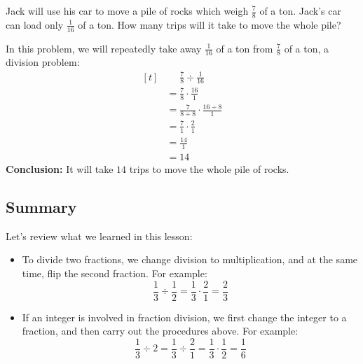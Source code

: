 \begin{myexample}
Jack will use his car to move a pile of rocks which weigh $\frac{7}{8}$ of a ton. Jack's car can load only $\frac{1}{16}$ of a ton. How many trips will it take to move the whole pile?
\end{myexample}
\begin{solution}
In this problem, we will repeatedly take away $\frac{1}{16}$ of a ton from $\frac{7}{8}$ of a ton, a division problem:
\[ 
\begin{aligned}[t]
	&\phantom{{}=} \frac{7}{8} \div \frac{1}{16} \\
	&= \frac{7}{8} \cdot \frac{16}{1} \\
	&= \frac{7}{8\div8} \cdot \frac{16\div8}{1} \\
	&= \frac{7}{1} \cdot \frac{2}{1} \\
	&= \frac{14}{1} \\
	&= 14
\end{aligned}
\]
\textbf{Conclusion:} It will take $14$ trips to move the whole pile of rocks.
\end{solution}


\subsection{Summary}
Let's review what we learned in this lesson:
\begin{itemize}
\item To divide two fractions, we change division to multiplication, and at the same time, flip the second fraction. For example: 
\[ \frac{1}{3} \div \frac{1}{2}= \frac{1}{3} \cdot \frac{2}{1} = \frac{2}{3} \]
\item If an integer is involved in fraction division, we first change the integer to a fraction, and then carry out the procedures above. For example:
\[ \frac{1}{3} \div 2 = \frac{1}{3} \div \frac{2}{1} = \frac{1}{3} \cdot \frac{1}{2} = \frac{1}{6} \]
\end{itemize}


